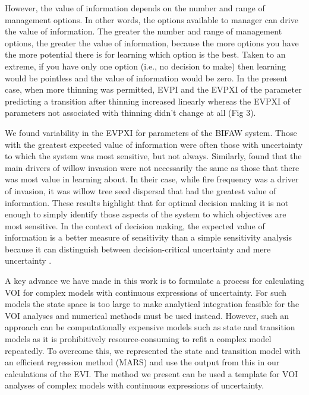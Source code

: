 \documentclass[]{article}
\begin{document}
However, the value of information depends on the number and range of
management options. In other words, the options available to manager can
drive the value of information. The greater the number and range of
management options, the greater the value of information, because the
more options you have the more potential there is for learning which
option is the best. Taken to an extreme, if you have only one option
(i.e., no decision to make) then learning would be pointless and the
value of information would be zero. In the present case, when more
thinning was permitted, EVPI and the EVPXI of the parameter predicting a
transition after thinning increased linearly whereas the EVPXI of
parameters not associated with thinning didn't change at all (Fig 3).

We found variability in the EVPXI for parameters of the BIFAW system.
Those with the greatest expected value of information were often those
with uncertainty to which the system was most sensitive, but not always.
Similarly, \citet{Moore2012} found that the main drivers of willow
invasion were not necessarily the same as those that there was most
value in learning about. In their case, while fire frequency was a
driver of invasion, it was willow tree seed dispersal that had the
greatest value of information. These results highlight that for optimal
decision making it is not enough to simply identify those aspects of the
system to which objectives are most sensitive. In the context of
decision making, the expected value of information is a better measure
of sensitivity than a simple sensitivity analysis because it can
distinguish between decision-critical uncertainty and mere uncertainty
\citep{Felli1998}.

A key advance we have made in this work is to formulate a process for
calculating VOI for complex models with continuous expressions of
uncertainty. For such models the state space is too large to make
analytical integration feasible for the VOI analyses and numerical
methods must be used instead. However, such an approach can be
computationally expensive models such as state and transition models as
it is prohibitively resource-consuming to refit a complex model
repeatedly. To overcome this, we represented the state and transition
model with an efficient regression method (MARS) and use the output from
this in our calculations of the EVI. The method we present can be used a
template for VOI analyses of complex models with continuous expressions
of uncertainty.
\end{document}
